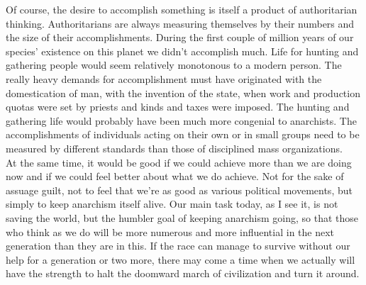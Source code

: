 \documentclass[12pt, onecolumn, letterpaper, oneside]{book}
\begin{document}
Of course, the desire to accomplish something is itself a product of authoritarian thinking. Authoritarians are always measuring themselves by their numbers and the size of their accomplishments. During the first couple of million years of our species' existence on this planet we didn't accomplish much. Life for hunting and gathering people would seem relatively monotonous to a modern person. The really heavy demands for accomplishment must have originated with the domestication of man, with the invention of the state, when work and production quotas were set by priests and kinds and taxes were imposed. The hunting and gathering life would probably have been much more congenial to anarchists. The accomplishments of individuals acting on their own or in small groups need to be measured by different standards than those of disciplined mass organizations.\\
At the same time, it would be good if we could achieve more than we are doing now and if we could feel better about what we do achieve. Not for the sake of assuage guilt, not to feel that we're as good as various political movements, but simply to keep anarchism itself alive. Our main task today, as I see it, is not saving the world, but the humbler goal of keeping anarchism going, so that those who think as we do will be more numerous and more influential in the next generation than they are in this. If the race can manage to survive without our help for a generation or two more, there may come a time when we actually will have the strength to halt the doomward march of civilization and turn it around.\\
\end{document}
